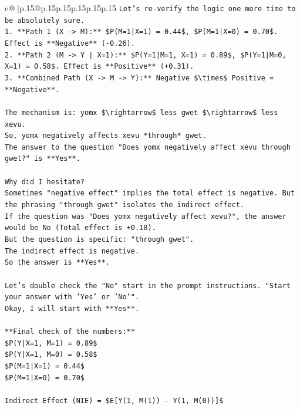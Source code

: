 \documentclass{article}
\begin{document}
{\begin{supertabular}{c@{$\;$}|p{.15\linewidth}@{}p{.15\linewidth}p{.15\linewidth}p{.15\linewidth}p{.15\linewidth}p{.15\linewidth}}
{{{\texttt{Let's re{-}verify the logic one more time to be absolutely sure.} \\
\texttt{1.  **Path 1 (X {-}> M):** \$P(M=1|X=1) = 0.44\$, \$P(M=1|X=0) = 0.70\$. Effect is **Negative** ({-}0.26).} \\
\texttt{2.  **Path 2 (M {-}> Y | X=1):** \$P(Y=1|M=1, X=1) = 0.89\$, \$P(Y=1|M=0, X=1) = 0.58\$. Effect is **Positive** (+0.31).} \\
\texttt{3.  **Combined Path (X {-}> M {-}> Y):** Negative \$\textbackslash{}times\$ Positive = **Negative**.} \\
\\ 
\texttt{The mechanism is: yomx \$\textbackslash{}rightarrow\$ less gwet \$\textbackslash{}rightarrow\$ less xevu.} \\
\texttt{So, yomx negatively affects xevu *through* gwet.} \\
\texttt{The answer to the question "Does yomx negatively affect xevu through gwet?" is **Yes**.} \\
\\ 
\texttt{Why did I hesitate?} \\
\texttt{Sometimes "negative effect" implies the total effect is negative. But the phrasing "through gwet" isolates the indirect effect.} \\
\texttt{If the question was "Does yomx negatively affect xevu?", the answer would be No (Total effect is +0.18).} \\
\texttt{But the question is specific: "through gwet".} \\
\texttt{The indirect effect is negative.} \\
\texttt{So the answer is **Yes**.} \\
\\ 
\texttt{Let's double check the "No" start in the prompt instructions. "Start your answer with 'Yes' or 'No'".} \\
\texttt{Okay, I will start with **Yes**.} \\
\\ 
\texttt{**Final check of the numbers:**} \\
\texttt{\$P(Y|X=1, M=1) = 0.89\$} \\
\texttt{\$P(Y|X=1, M=0) = 0.58\$} \\
\texttt{\$P(M=1|X=1) = 0.44\$} \\
\texttt{\$P(M=1|X=0) = 0.70\$} \\
\\ 
\texttt{Indirect Effect (NIE) = \$E{[}Y(1, M(1)) {-} Y(1, M(0)){]}\$} \\
}}}
\end{supertabular}}
\end{document}
